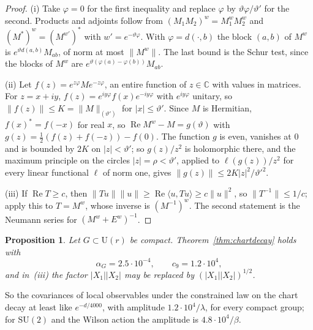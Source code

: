 \documentclass[11pt]{amsart}
\newtheorem{proposition}[theorem]{Proposition}
\theoremstyle{definition}
\theoremstyle{remark}
\numberwithin{equation}{section}
\newcommand{\C}{\mathbb{C}}
\newcommand{\SU}{\mathrm{SU}}
\newcommand{\U}{\mathrm{U}}
\begin{document}
\begin{proof}
(i) Take $\varphi=0$ for the first inequality and replace $\varphi$ by
$\vartheta\varphi/\vartheta'$ for the second. Products and adjoints follow
from $(M_1M_2)^w=M_1^wM_2^w$ and $(M^*)^w=(M^{w'})^*$ with $w'=e^{-\vartheta
\varphi}$. With $\varphi=d(\cdot,b)$ the block $(a,b)$ of $M^w$ is $e^{
\vartheta d(a,b)}M_{ab}$, of norm at most $\lVert M^w\rVert$. The last bound
is the Schur test, since the blocks of $M^w$ are $e^{\vartheta(\varphi(a)-
\varphi(b))}M_{ab}$.

(ii) Let $f(z)=e^{z\varphi}Me^{-z\varphi}$, an entire function of $z\in\C$
with values in matrices. For $z=x+iy$, $f(z)=e^{iy\varphi}f(x)e^{-iy\varphi}$
with $e^{iy\varphi}$ unitary, so $\lVert f(z)\rVert\le K=\lVert M\rVert_{(
\vartheta')}$ for $|x|\le\vartheta'$. Since $M$ is Hermitian, $f(x)^*=f(-x)$
for real $x$, so $\operatorname{Re}M^w-M=g(\vartheta)$ with $g(z)=\frac12(f(z)
+f(-z))-f(0)$. The function $g$ is even, vanishes at $0$ and is bounded by
$2K$ on $|z|<\vartheta'$; so $g(z)/z^2$ is holomorphic there, and the maximum
principle on the circles $|z|=\rho<\vartheta'$, applied to $\ell(g(z))/z^2$
for every linear functional $\ell$ of norm one, gives $\lVert g(z)\rVert
\le2K|z|^2/\vartheta'^2$.

(iii) If $\operatorname{Re}T\ge c$, then $\lVert Tu\rVert\lVert u\rVert\ge
\operatorname{Re}\langle u,Tu\rangle\ge c\lVert u\rVert^2$, so $\lVert T^{-1}
\rVert\le1/c$; apply this to $T=M^w$, whose inverse is $(M^{-1})^w$. The
second statement is the Neumann series for $(M^w+E^w)^{-1}$.
\end{proof}

\begin{proposition}\label{prop:explicitdecay}
Let $G\subset\U(r)$ be compact. Theorem~\ref{thm:chartdecay} holds with
\[
\alpha_G=2.5\cdot10^{-4},\qquad c_9=1.2\cdot10^4,
\]
and in~\textup{(iii)} the factor $\lvert X_1\rvert\lvert X_2\rvert$ may be
replaced by $(\lvert X_1\rvert\lvert X_2\rvert)^{1/2}$.
\end{proposition}

So the covariances of local observables under the constrained law on the
chart decay at least like $e^{-d/4000}$, with amplitude $1.2\cdot10^4/
\lambda$, for every compact group; for $\SU(2)$ and the Wilson action the
amplitude is $4.8\cdot10^4/\beta$.
\end{document}

